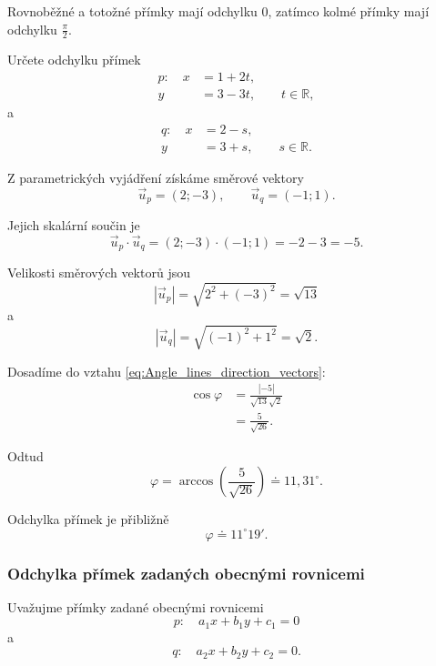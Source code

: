 Rovnoběžné a totožné přímky mají odchylku $0$, zatímco kolmé přímky
mají odchylku $\frac{\pi}{2}$.

\begin{example}\label{exa:Angle_parametric_lines}
    Určete odchylku přímek
    \[
        \begin{aligned}
            p:\quad x&=1+2t,\\
                     y&=3-3t,
                     \qquad t\in\mathbb{R},
        \end{aligned}
    \]
    a
    \[
        \begin{aligned}
            q:\quad x&=2-s,\\
                     y&=3+s,
                     \qquad s\in\mathbb{R}.
        \end{aligned}
    \]

    Z parametrických vyjádření získáme směrové vektory
    \[
        \vec{u}_p=(2;-3),
        \qquad
        \vec{u}_q=(-1;1).
    \]

    Jejich skalární součin je
    \[
        \vec{u}_p\cdot\vec{u}_q
        =
        (2;-3)\cdot(-1;1)
        =
        -2-3
        =
        -5.
    \]

    Velikosti směrových vektorů jsou
    \[
        |\vec{u}_p|
        =
        \sqrt{2^2+(-3)^2}
        =
        \sqrt{13}
    \]
    a
    \[
        |\vec{u}_q|
        =
        \sqrt{(-1)^2+1^2}
        =
        \sqrt2.
    \]

    Dosadíme do vztahu
    \eqref{eq:Angle_lines_direction_vectors}:
    \begin{align*}
        \cos\varphi
        &=
        \frac{|-5|}{\sqrt{13}\sqrt2}\\
        &=
        \frac{5}{\sqrt{26}}.
    \end{align*}

    Odtud
    \[
        \varphi
        =
        \arccos\left(\frac{5}{\sqrt{26}}\right)
        \doteq
        11{,}31^\circ.
    \]

    Odchylka přímek je přibližně
    \[
        \varphi\doteq11^\circ19'.
    \]
\end{example}


\subsubsection{Odchylka přímek zadaných obecnými rovnicemi}
\label{subsubsec:Angle_general_lines}

Uvažujme přímky zadané obecnými rovnicemi
\[
    p:\quad a_1x+b_1y+c_1=0
\]
a
\[
    q:\quad a_2x+b_2y+c_2=0.
\]

